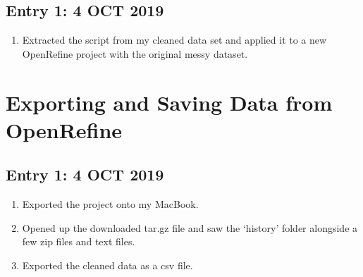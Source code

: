 \documentclass{article}
\begin{document}
\subsection{Entry 1: 4 OCT 2019}

\begin{enumerate}
    \item Extracted the script from my cleaned data set and applied it to a new OpenRefine project with the original messy dataset.
\end{enumerate}

\section{Exporting and Saving Data from OpenRefine}

\subsection{Entry 1: 4 OCT 2019}

\begin{enumerate}
    \item Exported the project onto my MacBook.
    \item Opened up the downloaded tar.gz file and saw the `history' folder alongside a few zip files and text files.
    \item Exported the cleaned data as a csv file.
\end{enumerate}
\end{document}
